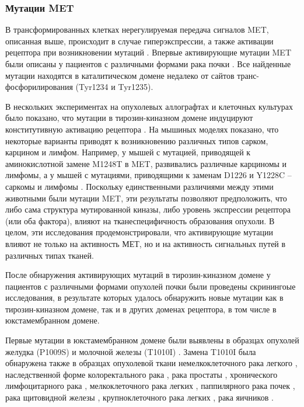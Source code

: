 \subsubsection{Мутации MET}

В трансформированных клетках нерегулируемая передача сигналов MET, описанная выше, происходит в случае гиперэкспрессии, а также активации рецептора при возникновении мутаций \cite{tovar_met_2017}. Впервые активирующие мутации MET были описаны у пациентов с различными формами рака почки \cite{schmidt_novel_1999}. Все найденные мутации находятся в каталитическом домене недалеко от сайтов транс-фосфорилирования (Tyr1234 и Tyr1235). 

В нескольких экспериментах на опухолевых аллографтах и клеточных культурах было показано, что мутации в тирозин-киназном домене индуцируют конститутивную активацию рецептора \cite{jeffers_activating_1997}. На мышиных моделях показано, что некоторые варианты приводят к возникновению различных типов сарком, карцином и лимфом. Например, у мышей с мутацией, приводящей к аминокислотной замене M1248T в MET, развивались различные карциномы и лимфомы, а у мышей с мутациями, приводящими к заменам D1226 и Y1228C – саркомы и лимфомы \cite{graveel_activating_2004}. Поскольку единственными различиями между этими животными были мутации MET, эти результаты позволяют предположить, что либо сама структура мутированной киназы, либо уровень экспрессии рецептора (или оба фактора), влияют на тканеспецифичность образования опухоли. В целом, эти исследования продемонстрировали, что активирующие мутации влияют не только на активность МЕТ, но и на активность сигнальных путей в различных типах тканей. 

После обнаружения активирующих мутаций в тирозин-киназном домене у пациентов с различными формами опухолей почки были проведены скринингоые исследования, в результате которых удалось обнаружить новые мутации как в тирозин-киназном домене, так и в других доменах рецептора, в том числе в юкстамембранном домене.

Первые мутации в юкстамембранном домене были выявлены в образцах опухолей желудка (P1009S) \cite{lee_novel_2000} и молочной железы (T1010I) \cite{lee_novel_2000}. Замена T1010I была обнаружена также в образцах опухолевой ткани немелкоклеточного рака легкого \cite{tengs_transforming_2006}, наследственной форме колоректального рака \cite{neklason_activating_2011}, рака простаты \cite{sethi_comprehensive_2013}, хронического лимфоцитарного рака \cite{brown_systematic_2008}, мелкоклеточного рака легких  \cite{ma_c-met_2003}, паппилярного рака почек \cite{schmidt_novel_1999}, рака щитовидной железы \cite{wasenius_met_2005}, крупноклеточного рака легких \cite{lee_novel_2000}, рака яичников \cite{tang_met_2014}. 

